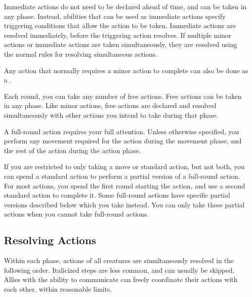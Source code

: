         Immediate actions do not need to be declared ahead of time, and can be taken in any phase.
        Instead, abilities that can be used as immediate actions specify triggering conditions that allow the action to be taken.
        Immediate actions are resolved immediately, before the triggering action resolves.
        If multiple minor actions or immediate actions are taken simultaneously, they are resolved using the normal rules for resolving simultaneous actions.

         Any action that normally requires a minor action to complete can also be done as a .

        \label{Free Actions} Each round, you can take any number of free actions.
        Free actions can be taken in any phase.
        Like minor actions, free actions are declared and resolved simultaneously with other actions you intend to take during that phase.

         A full-round action requires your full attention.
        Unless otherwise specified, you perform any movement required for the action during the movement phase, and the rest of the action during the action phase.

         If you are restricted to only taking a move or standard action, but not both, you can spend a standard action to perform a partial version of a full-round action. For most actions, you spend the first round starting the action, and use a second standard action to complete it. Some full-round actions have specific partial versions described below which you take instead. You can only take these partial actions when you cannot take full-round actions.

    \subsection{Resolving Actions}\label{Resolving Actions}

        Within each phase, actions of all creatures are simultaneously resolved in the following order.
        Italicized steps are less common, and can usually be skipped.
        Allies with the ability to communicate can freely coordinate their actions with each other, within reasonable limits.


